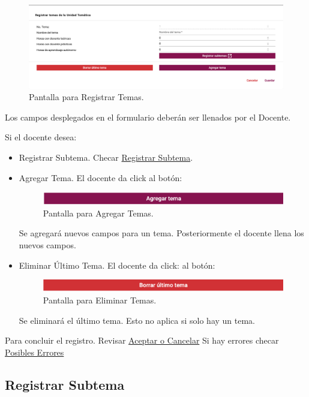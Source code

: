 \hypertarget{RTema}{}
\begin{figure}[!hbtp]
    \centering
    \includegraphics[width=0.7\linewidth]{images/SP6/RegistrarTema.png}
    \caption{Pantalla para Registrar Temas.} 
\end{figure}

Los campos desplegados en el formulario deberán ser llenados por el Docente.

Si el docente desea:
\begin{itemize}
    \item Registrar Subtema. Checar \hyperlink{RegistrarSubtema}{Registrar Subtema}.
    \item Agregar Tema. El docente da click al botón:
    \begin{figure}[!hbtp]
    \centering
    \includegraphics[width=0.4\linewidth]{images/SP6/AgregarTema.png}
    \caption{Pantalla para Agregar Temas.} 
    \end{figure}
    Se agregará nuevos campos para un tema. Posteriormente el docente llena los nuevos campos.
    \item Eliminar Último Tema. El docente da click: al botón:
    \begin{figure}[!hbtp]
    \centering
    \includegraphics[width=0.4\linewidth]{images/SP6/EliminarTema.png}
    \caption{Pantalla para Eliminar Temas.} 
    \end{figure}
    Se eliminará el último tema. Esto no aplica si solo hay un tema.
\end{itemize}

Para concluir el registro. Revisar \hyperlink{AceptarCancelar}{Aceptar o Cancelar}
Si hay errores checar \hyperlink{Errores}{Posibles Errores}

\pagebreak
\hypertarget{RegistrarSubtema}{\subsection{Registrar Subtema}}



